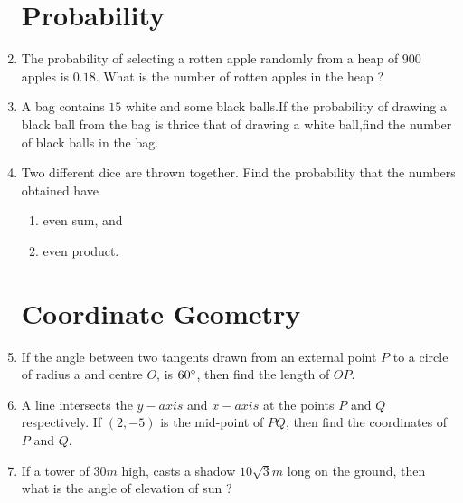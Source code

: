 \documentclass{article}
\providecommand{\brak}[1]{\ensuremath{\left(#1\right)}}
\begin{document}
\begin{enumerate}
																					\section{Probability}
																					        \item The probability of selecting a rotten apple randomly from a heap of $900$ apples is $0.18$. What is the number of rotten apples in the heap ?
																							    
																							        \item A bag contains $15$ white and some black balls.If the probability of drawing a black ball from the bag is thrice that of drawing a white ball,find the number of black balls in the bag.

																									    \item Two different dice are thrown together. Find the probability that the numbers obtained have
																										        \begin{enumerate}
																													        \item  even sum, and
																															        \item  even product.
																																	    \end{enumerate}
																																	        
																																		\section{Coordinate Geometry}

																																		    \item If the angle between two tangents drawn from an external point $P$ to a circle of radius a and centre $O$, is $60\degree$, then find the length of $OP$.

																																			        \item A line intersects the $y-axis$ and $x-axis$ at the points $P$ and $Q$ respectively. If $\brak{2,-5}$ is the mid-point of $PQ$, then find the coordinates of $P$ and $Q$.
																																					    
																																					    \item If a tower of $30 m $ high, casts a shadow $10\sqrt{3} m$ long on the ground, then what is the angle of elevation of sun ?
																																						        

\end{enumerate}
\end{document}
